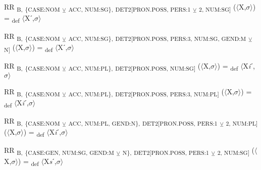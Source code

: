 {\begin{exe}
 RR \textsubscript{B,} \textsubscript{\{CASE:NOM} \textsubscript{${\veebar}$}\textsubscript{ ACC, NUM:SG\},} \textsubscript{DET2[PRON.POSS, PERS:1} \textsubscript{${\veebar}$}\textsubscript{ 2, NUM:SG]} ($\langle$X,$\sigma $$\rangle$) = \textsubscript{def} $\langle$Xˊ,$\sigma $$\rangle$
\end{exe}

\begin{exe}
 RR \textsubscript{B,} \textsubscript{\{CASE:NOM} \textsubscript{${\veebar}$}\textsubscript{ ACC, NUM:SG\},} \textsubscript{DET2[PRON.POSS, PERS:3, NUM:SG, GEND:M} \textsubscript{${\veebar}$}\textsubscript{ N]} ($\langle$X,$\sigma $$\rangle$) = \textsubscript{def} $\langle$Xˊ,$\sigma $$\rangle$
\end{exe}

\begin{exe}
 RR \textsubscript{B,} \textsubscript{\{CASE:NOM} \textsubscript{${\veebar}$}\textsubscript{ ACC, NUM:PL\},} \textsubscript{DET2[PRON.POSS, NUM:SG]} ($\langle$X,$\sigma $$\rangle$) = \textsubscript{def} $\langle$X\textit{i}ˊ,$\sigma $$\rangle$
\end{exe}

\begin{exe}
 RR \textsubscript{B,} \textsubscript{\{CASE:NOM} \textsubscript{${\veebar}$}\textsubscript{ ACC, NUM:PL\},} \textsubscript{DET2[PRON.POSS, PERS:3, NUM:PL]} ($\langle$X,$\sigma $$\rangle$) = \textsubscript{def} $\langle$X\textit{i}ˊ,$\sigma $$\rangle$
\end{exe}

\begin{exe}
 RR \textsubscript{B,} \textsubscript{\{CASE:NOM} \textsubscript{${\veebar}$}\textsubscript{ ACC, NUM:PL, GEND:N\},} \textsubscript{DET2[PRON.POSS, PERS:1} \textsubscript{${\veebar}$}\textsubscript{ 2, NUM:PL]} ($\langle$X,$\sigma $$\rangle$) = \textsubscript{def} $\langle$X\textit{i}ˊ,$\sigma $$\rangle$
\end{exe}

\begin{exe}
 RR \textsubscript{B,} \textsubscript{\{CASE:GEN, NUM:SG, GEND:M} \textsubscript{${\veebar}$}\textsubscript{ N\},} \textsubscript{DET2[PRON.POSS, PERS:1} \textsubscript{${\veebar}$}\textsubscript{ 2, NUM:SG]} ($\langle$X,$\sigma $$\rangle$) = \textsubscript{def} $\langle$X\textit{s}ˊ,$\sigma $$\rangle$
\end{exe}

}
